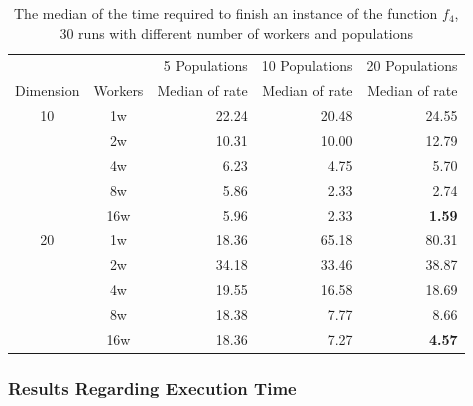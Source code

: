 \documentclass[review]{elsarticle}
\begin{document}
\begin{table}[tbp]
  \caption{The median of the time required to finish an instance of the function $f_4$, 30 runs
  with different number of workers and populations} %
  \label{tab:time}
  \vspace{0.25cm}
    \centering
    \begin{tabular}{ccrrr}
    \hline
              &         & 5 Populations    & 10 Populations & 20 Populations \\
     Dimension& Workers & Median of rate & Median of rate & Median of rate  \\
    \hline
          10  & 1w      & 22.24  & 20.48           & 24.55  \\
              & 2w      & 10.31  & 10.00           & 12.79 \\
              & 4w      &  6.23  & 4.75            &  5.70 \\
              & 8w      &  5.86  &  2.33           & 2.74 \\
              & 16w     &  5.96  &  2.33           & \textbf{1.59}\\
    
    \hline
          20  & 1w   & 18.36   & 65.18  & 80.31 \\
              & 2w   & 34.18   & 33.46  & 38.87 \\
              & 4w   & 19.55   & 16.58  & 18.69 \\
              & 8w   & 18.38   & 7.77   & 8.66 \\
              & 16w  & 18.36   & 7.27   & \textbf{4.57} \\
    \hline
  \end{tabular}
\end{table}





\subsubsection{Results Regarding Execution Time}
\label{sec:exec-time}
\end{document}
